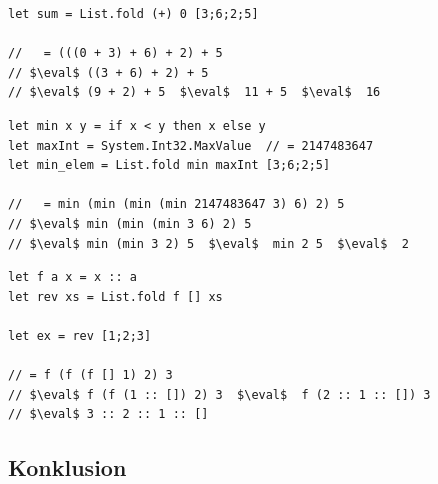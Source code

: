 \documentclass[rgb]{beamer}
\begin{document}
\begin{frame}[fragile]
\begin{footnotesize}

\vspace{1ex}

\begin{lstlisting}[numbers=none,frame=none,mathescape]
let sum = List.fold (+) 0 [3;6;2;5]

//   = (((0 + 3) + 6) + 2) + 5
// $\eval$ ((3 + 6) + 2) + 5
// $\eval$ (9 + 2) + 5  $\eval$  11 + 5  $\eval$  16
\end{lstlisting}

\vspace{1ex}
\vspace{1ex}

\begin{lstlisting}[numbers=none,frame=none,mathescape]
let min x y = if x < y then x else y
let maxInt = System.Int32.MaxValue  // = 2147483647
let min_elem = List.fold min maxInt [3;6;2;5]

//   = min (min (min (min 2147483647 3) 6) 2) 5
// $\eval$ min (min (min 3 6) 2) 5
// $\eval$ min (min 3 2) 5  $\eval$  min 2 5  $\eval$  2
\end{lstlisting}

\end{footnotesize}
\end{frame}

\begin{frame}[fragile]
\begin{footnotesize}
\vspace{1ex}

\begin{lstlisting}[numbers=none,frame=none,mathescape]
let f a x = x :: a
let rev xs = List.fold f [] xs

let ex = rev [1;2;3]

// = f (f (f [] 1) 2) 3
// $\eval$ f (f (1 :: []) 2) 3  $\eval$  f (2 :: 1 :: []) 3
// $\eval$ 3 :: 2 :: 1 :: []
\end{lstlisting}

\end{footnotesize}
\end{frame}

\subsection*{Konklusion}
\begin{frame}[fragile]

  \vspace{3mm}
  \tableofcontents
\end{frame}
\end{document}
